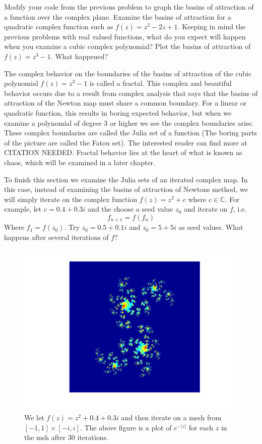 \begin{problem}
Modify your code from the previous problem to graph the basins of attraction of a function over the complex plane.  Examine the basins of attraction for a quadratic complex function such as $f(z) = z^2 - 2z + 1$.  Keeping in mind the previous problems with real valued functions, what do you expect will happen when you examine a cubic complex polynomial?  Plot the basins of attraction of $f(z) = z^3 - 1$.  What happened?
\end{problem}

The complex behavior on the boundaries of the basins of attraction of the cubic polynomial $f(z) = z^3 - 1$ is called a fractal.  This complex and beautiful behavior occurs due to a result from complex analysis that says that the basins of attraction of the Newton map must share a common boundary.  For a linear or quadratic function, this results in boring expected behavior, but when we examine a polynomial of degree 3 or higher we see the complex boundaries arise.  These complex boundaries are called the Julia set of a function (The boring parts of the picture are called the Fatou set).  The interested reader can find more at CITATION NEEDED. Fractal behavior lies at the heart of what is known as chaos, which will be examined in a later chapter.

To finish this section we examine the Julia sets of an iterated complex map.  In this case, instead of examining the basins of attraction of Newtons method, we will simply iterate on the complex function $f(z) = z^2 + c$ where $c \in \mathbb{C}$.  For example, let $c = 0.4 + 0.3i$ and the choose a seed value $z_0$ and iterate on $f$, i.e.
\[
f_{n+1} = f(f_n)
\]
Where $f_1 = f(z_0)$.  Try $z_0 = 0.5 + 0.1i$ and $z_0 = 5 + 5i$ as seed values.  What happens after several iterations of $f$?

\begin{figure}\label{Fig:julia}
\begin{center}
\includegraphics[scale=0.5]{julia}
\caption{We let $f(z) = z^2 + 0.4 + 0.3i$ and then iterate on a mesh from $[-1,1]\times[-i,i]$.  The above figure is a plot of $e^{-|z|}$ for each $z$ in the msh after $30$ iterations.}
\end{center}
\end{figure}


